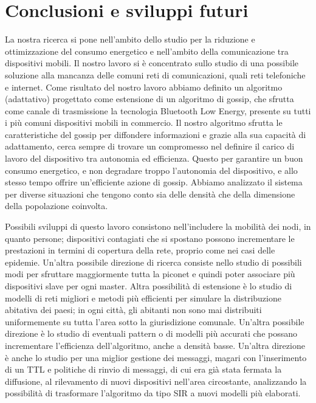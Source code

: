 \chapter{Conclusioni e sviluppi futuri}
\label{chap:conclusioni_sviluppiFuturi}

La nostra ricerca si pone nell'ambito dello studio per la riduzione e ottimizzazione del consumo energetico e nell'ambito della comunicazione tra dispositivi mobili.  Il nostro lavoro si è concentrato sullo studio di una possibile soluzione alla mancanza delle comuni reti di comunicazioni, quali reti telefoniche e internet. Come risultato del nostro lavoro abbiamo definito un algoritmo (adattativo) progettato come estensione di un algoritmo di gossip, che sfrutta come canale di trasmissione la tecnologia Bluetooth Low Energy, presente su tutti i più comuni dispositivi mobili in commercio. Il nostro algoritmo sfrutta le caratteristiche del gossip per diffondere informazioni e grazie alla sua capacità di adattamento, cerca sempre di trovare un compromesso nel definire il carico di lavoro del dispositivo tra autonomia ed efficienza. Questo per garantire un buon consumo energetico, e non degradare troppo l'autonomia del dispositivo, e allo stesso tempo offrire un'efficiente azione di gossip. Abbiamo analizzato il sistema per diverse situazioni che tengono conto sia delle densità che della dimensione della popolazione coinvolta.

Possibili sviluppi di questo lavoro consistono nell'includere la mobilità dei nodi, in quanto persone; dispositivi contagiati che si spostano possono incrementare le prestazioni in termini di copertura della rete, proprio come nei casi delle epidemie. Un'altra possibile direzione di ricerca consiste nello studio di possibili modi per sfruttare maggiormente tutta la piconet e quindi poter associare più dispositivi slave per ogni master. Altra possibilità di estensione è lo studio di modelli di reti migliori e metodi più efficienti per simulare la distribuzione abitativa dei paesi; in ogni città, gli abitanti non sono mai distribuiti uniformemente su tutta l'area sotto la giurisdizione comunale. Un'altra possibile direzione è lo studio di eventuali pattern o di modelli più accurati che possano incrementare l'efficienza dell'algoritmo, anche a densità basse. Un'altra direzione è anche lo studio per una miglior gestione dei messaggi, magari con l'inserimento di un \acf{TTL} e politiche di rinvio di messaggi, di cui era già stata fermata la diffusione, al rilevamento di nuovi dispositivi nell'area circostante, analizzando la possibilità di trasformare l'algoritmo da tipo \acs{SIR} a nuovi modelli più elaborati.